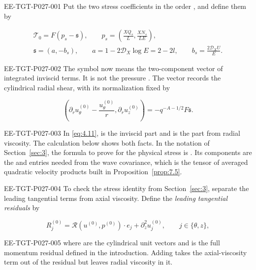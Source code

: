 %
\begin{EESegment}{EE-TGT-P027-001}
Put the two stress coefficients in the order
, and define them by
\end{EESegment}
\begin{equation}
\begin{gathered}
 \mathcal T_0=F(p_s-\mathfrak{s}),
 \qquad
 p_s=\left(\frac{XQ_s}{L},\frac{XN_s}{LE}\right),\\
 \mathfrak{s}=(a,-b_s),
 \qquad
 a=1-2\mathcal D_X\log E=2-2l,
 \qquad
 b_s=\frac{2\mathcal D_XU}{E}.
\end{gathered}
\tag{4.11}\label{eq:4.11}
\end{equation}
\begin{EESegment}{EE-TGT-P027-002}
The symbol  now means the two-component vector of
integrated inviscid terms. It is not the pressure
. The vector
 records the cylindrical radial
shear, with its normalization fixed by
\end{EESegment}
\[
 \left(\partial_ru_\theta^{(0)}-\frac{u_\theta^{(0)}}{r},
       \partial_ru_z^{(0)}\right)
 =-q^{-A-1/2}F\mathfrak{s}.
\]
\begin{EESegment}{EE-TGT-P027-003}
In \eqref{eq:4.11},  is the inviscid part and
 is the part from radial viscosity. The
calculation below shows both facts. In the notation of Section~\ref{sec:3},
the formula to prove for the physical stress is
. Its components are the
 and  entries needed from
the wave covariance, which is the tensor of averaged quadratic velocity
products built in Proposition~\ref{prop:7.5}.
\end{EESegment}

\begin{EESegment}{EE-TGT-P027-004}
To check the stress identity from Section~\ref{sec:3}, separate the leading
tangential terms from axial viscosity. Define the
\emph{leading tangential residuals} by
\end{EESegment}
\begin{equation}
 R_j^{(0)}=\mathscr R(u^{(0)},p^{(0)})\mathbin{\cdot}e_j
            +\partial_z^2u_j^{(0)},
 \qquad j\in\{\theta,z\},
\tag{4.12}\label{eq:4.12}
\end{equation}
\begin{EESegment}{EE-TGT-P027-005}
where  are the cylindrical unit vectors and
 is the full momentum residual defined in the
introduction. Adding  takes the
axial-viscosity term out of the residual but leaves radial viscosity in it.
\end{EESegment}


